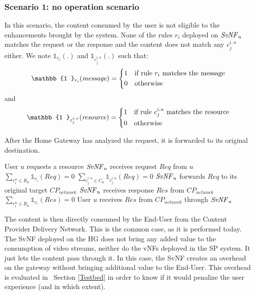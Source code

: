 \subsubsection*{Scenario 1: no operation scenario}\label{noop}

In this scenario, the content consumed by the user is not eligible to the enhancements brought by the system. None of the rules $r_{i}$ deployed on $\mathit{SvNF}_{u}$ matches the request or the response and the content does not match any $c^{i,u}_{j}$ either. We note $\mathbb{1}_{r_{i}}(.)$ and $\mathbb{1}_{c^{i,u}_{j}}(.)$ such that:
\[
    \mathbb{1 }_{r_{i}}(\mathit{message})= 
\begin{dcases}
    1& \text{if rule $r_{i}$ matches the message} \\
    0              & \text{otherwise}
\end{dcases}
\]
and 
\[
    \mathbb{1 }_{c^{i,u}_{j}}(\mathit{resource})= 
\begin{dcases}
    1& \text{if rule $c^{i,u}_{j}$ matches the resource} \\
    0              & \text{otherwise}
\end{dcases}
\]

After the Home Gateway has analyzed the request, it is forwarded to its original destination.

\begin{algorithmic}[1]
	
\STATE User $u$ requests a resource
\STATE $\mathit{SvNF}_{u}$ receives request $\mathit{Req}$ from $u$
\STATE \( \sum_{r^{u}_{i}\in R_{u}}{\mathbb{1}_{r_{i}}(\mathit{Req})}=0 \)
\STATE \( \sum_{c^{i,u}_{j}\in C_{u}}{\mathbb{1}_{c^{i,u}_{j}}(\mathit{Req})}=0 \)
\STATE $\mathit{SvNF}_{u}$ forwards $\mathit{Req}$ to its original target \(\mathit{CP}_{\mathit{network}}\)
\STATE $\mathit{SvNF}_{u}$ receives response $\mathit{Res}$ from \(\mathit{CP}_{\mathit{network}}\)
\STATE \( \sum_{r^{u}_{i}\in R_{u}}{\mathbb{1}_{r_{i}}(\mathit{Res})}=0 \)
\STATE User $u$ receives $\mathit{Res}$ from \(\mathit{CP}_{\mathit{network}}\) through $\mathit{SvNF}_{u}$
\end{algorithmic}


The content is then directly consumed by the End-User from the Content Provider Delivery Network.
This is the common case, as it is performed today. The SvNF deployed on the HG does not bring any added value to the consumption of video streams, neither do the vNFs deployed in the SP system. It just lets the content pass through it.
In this case, the SvNF creates an overhead on the gateway without bringing additional value to the End-User.
This overhead is evaluated in ~Section \ref{Testbed} in order to know if it would penalize the user experience (and in which extent).

